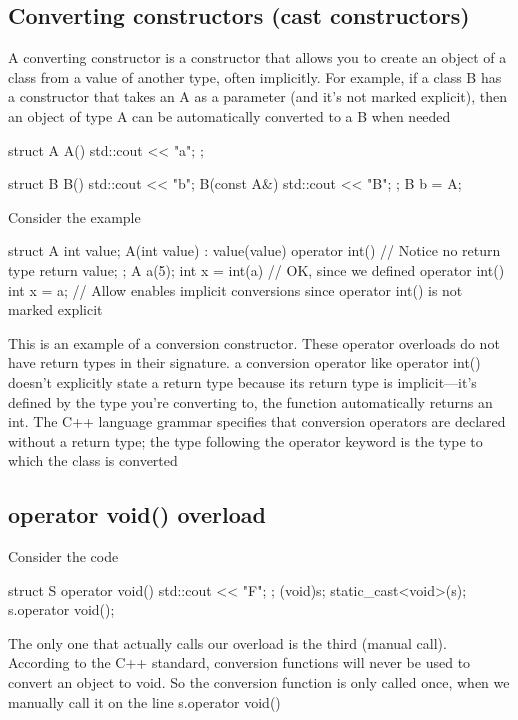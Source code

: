 \documentclass{report}
\begin{document}
    \subsection{Converting constructors (cast constructors)}
    \bigbreak \noindent 
    A converting constructor is a constructor that allows you to create an object of a class from a value of another type, often implicitly. For example, if a class B has a constructor that takes an A as a parameter (and it's not marked explicit), then an object of type A can be automatically converted to a B when needed
    \bigbreak \noindent 
    \begin{cppcode}
        struct A {
            A() { std::cout << "a"; }
        };

        struct B {
            B() { std::cout << "b"; }
            B(const A&) { std::cout << "B"; }
        };
        B b = A{};
    \end{cppcode}
    \bigbreak \noindent 
    Consider the example
    \bigbreak \noindent 
    \begin{cppcode}
        struct A {
            int value;   
            A(int value) : value(value) {}
            operator int() { // Notice no return type
                return value;
            }
        };
        A a(5);
        int x = int(a) // OK, since we defined operator int()  
        int x = a; // Allow enables implicit conversions since operator int() is not marked explicit
    \end{cppcode}
    \bigbreak \noindent 
    This is an example of a conversion constructor. These operator overloads  do not have return types in their signature. a conversion operator like operator int() doesn’t explicitly state a return type because its return type is implicit—it’s defined by the type you're converting to, the function automatically returns an int. 
    \bigbreak \noindent 
    The C++ language grammar specifies that conversion operators are declared without a return type; the type following the operator keyword is the type to which the class is converted

    \bigbreak \noindent 
    \subsection{operator void() overload}
    \bigbreak \noindent 
    Consider the code
    \bigbreak \noindent 
    \begin{cppcode}
        struct S {
            operator void() {
                std::cout << "F";
            }
        };
        (void)s;
        static_cast<void>(s);
        s.operator void();
    \end{cppcode}
    \bigbreak \noindent 
    The only one that actually calls our overload is the third (manual call). According to the C++ standard, conversion functions will never be used to convert an object to void. So the conversion function is only called once, when we manually call it on the line s.operator void()
\end{document}
